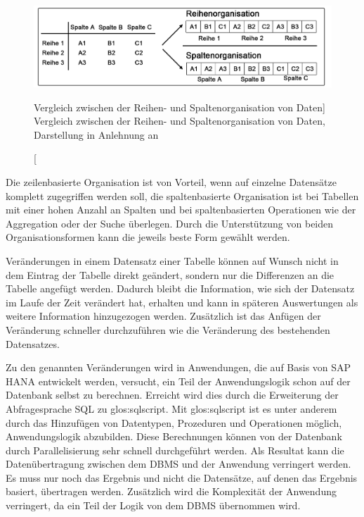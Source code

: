 \begin{onehalfspacing}
\begin{figure}[h]
\centering
\setlength{\unitlength}{1mm}
\includegraphics[width=15cm]{images/in-memory-row-column.png}
\caption
[Vergleich zwischen der Reihen- und Spaltenorganisation von Daten]
{Vergleich zwischen der Reihen- und Spaltenorganisation von Daten, Darstellung in Anlehnung an  \label{fig:vergleich_spalte_zeile}}
\end{figure} 

Die zeilenbasierte Organisation ist von Vorteil, wenn auf einzelne Datensätze komplett zugegriffen werden soll, die spaltenbasierte Organisation ist bei Tabellen mit einer hohen Anzahl an Spalten und bei spaltenbasierten Operationen wie der Aggregation oder der Suche überlegen. Durch die Unterstützung von beiden Organisationsformen kann die jeweils beste Form gewählt werden.

Veränderungen in einem Datensatz einer Tabelle können auf Wunsch nicht in dem Eintrag der Tabelle direkt geändert, sondern nur die Differenzen an die Tabelle angefügt werden. Dadurch bleibt die Information, wie sich der Datensatz im Laufe der Zeit verändert hat, erhalten und kann in späteren Auswertungen als weitere Information hinzugezogen werden. Zusätzlich ist das Anfügen der Veränderung schneller durchzuführen wie die Veränderung des bestehenden Datensatzes.

Zu den genannten Veränderungen wird in Anwendungen, die auf Basis von SAP HANA entwickelt werden, versucht, ein Teil der Anwendungslogik schon auf der Datenbank selbst zu berechnen. Erreicht wird dies durch die Erweiterung der Abfragesprache \gls{SQL} zu \gls{glos:sqlscript}. Mit \gls{glos:sqlscript} ist es unter anderem durch das Hinzufügen von Datentypen, Prozeduren und Operationen möglich, Anwendungslogik abzubilden. Diese Berechnungen können von der Datenbank durch Parallelisierung sehr schnell durchgeführt werden. Als Resultat kann die Datenübertragung zwischen dem \gls{DBMS} und der Anwendung verringert werden. Es muss nur noch das Ergebnis und nicht die Datensätze, auf denen das Ergebnis basiert, übertragen werden. Zusätzlich wird die Komplexität der Anwendung verringert, da ein Teil der Logik von dem \gls{DBMS} übernommen wird.


\end{onehalfspacing}

